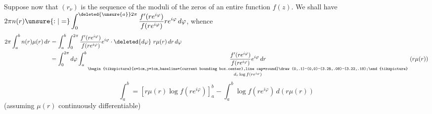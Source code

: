 Suppose now that $(r_\nu)$ is the sequence of the
moduli of the zeros of an entire function $f(z)$.
We shall have $\displaystyle 2\pi n(r)\unsure{:|=}\int_0^{\deleted{\unsure{a}}2\pi}\frac{f'(re^{i\varphi})}{f(re^{i\varphi})}re^{i\varphi}\,d\varphi$, whence
\[
\begin{aligned}
2\pi\int_a^b n(r)\mu(r)\,dr
&=\int_a^b\int_0^{2\pi}\frac{f'(re^{i\varphi})}{f(re^{i\varphi})}e^{i\varphi}\cdot\deleted{d\varphi}\ r\mu(r)\,dr\,d\varphi\\
&=\int_0^{2\pi}d\varphi\int_a^b
\underset{d_r\log f(re^{i\varphi})}{\underset{\begin{tikzpicture}[x=1cm,y=1cm,baseline=(current bounding box.center),line cap=round]\draw (0,.1)--(0,0)--(3.25,.08)--(3.22,.18);\end{tikzpicture}}{\frac{f'(re^{i\varphi})}{f(re^{i\varphi})}e^{i\varphi}\,dr}}\ (r\mu(r))
\end{aligned}
\]
\[
\int_a^b=\left[r\mu(r)\log f(re^{i\varphi})\right]_a^b-\int_a^b\log f(re^{i\varphi})\,d(r\mu(r))
\]
(assuming $\mu(r)$ continuously differentiable)

